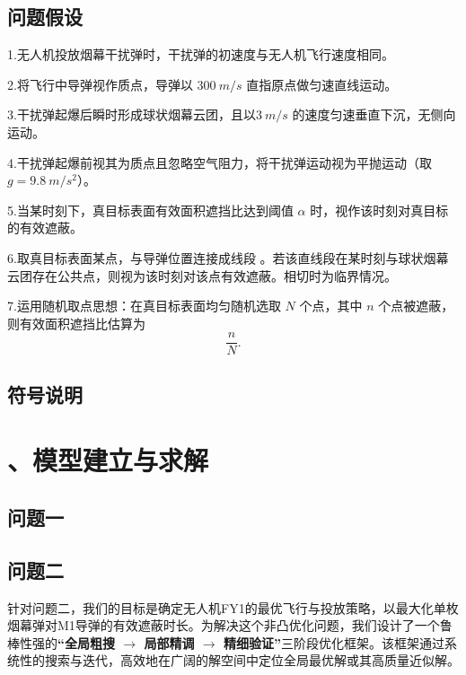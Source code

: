 \documentclass[12pt]{article}
\begin{document}
\begin{CJK}{UTF8}{gbsn}
	\subsection{问题假设}
	
		1.无人机投放烟幕干扰弹时，干扰弹的初速度与无人机飞行速度相同。
				
		2.将飞行中导弹视作质点，导弹以 \(\SI{300}{m/s}\) 直指原点做匀速直线运动。
		
		3.干扰弹起爆后瞬时形成球状烟幕云团，且以\(\SI{3}{m/s}\) 的速度匀速垂直下沉，无侧向运动。
		
		4.干扰弹起爆前视其为质点且忽略空气阻力，将干扰弹运动视为平抛运动（取\(g = \SI{9.8}{m/s^2}\)）。
		
		5.当某时刻下，真目标表面有效面积遮挡比达到阈值 \(\alpha\) 时，视作该时刻对真目标的有效遮蔽。
		
		6.取真目标表面某点，与导弹位置连接成线段 。若该直线段在某时刻与球状烟幕云团存在公共点，则视为该时刻对该点有效遮蔽。相切时为临界情况。
		
		7.运用随机取点思想：在真目标表面均匀随机选取 \(N\) 个点，其中 \(n\) 个点被遮蔽，
		则有效面积遮挡比估算为
		\[
		\frac{n}{N}.
		\]
	
	
	
	
	\subsection{符号说明}
	
	
	\section{、模型建立与求解}
	
	\subsection{问题一}
	
	\subsubsection{}
	
	\subsection{问题二}
	
	针对问题二，我们的目标是确定无人机FY1的最优飞行与投放策略，以最大化单枚烟幕弹对M1导弹的有效遮蔽时长。为解决这个非凸优化问题，我们设计了一个鲁棒性强的\textbf{“全局粗搜 $\rightarrow$ 局部精调 $\rightarrow$ 精细验证”}三阶段优化框架。该框架通过系统性的搜索与迭代，高效地在广阔的解空间中定位全局最优解或其高质量近似解。
	

\end{CJK}
\end{document}
